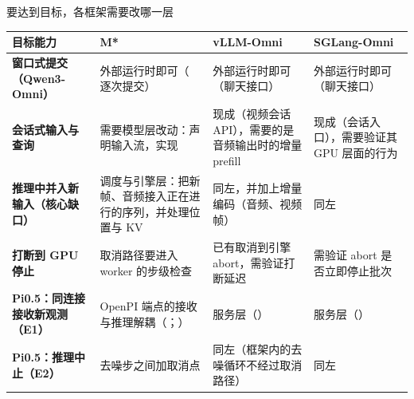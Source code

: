 \begin{frame}[t]{要达到目标，各框架需要改哪一层}
\scriptsize
\renewcommand{\arraystretch}{1.12}
\setlength{\tabcolsep}{3pt}
\begin{tabularx}{\textwidth}{>{\bfseries}p{2.6cm} Y Y Y}
\toprule
{}
目标能力 & M* & vLLM-Omni & SGLang-Omni \\
\midrule
窗口式提交（Qwen3-Omni） & 外部运行时即可（ 逐次提交） & 外部运行时即可（聊天接口） & 外部运行时即可（聊天接口） \\
会话式输入与查询 & 需要模型层改动：声明输入流，实现  & 现成（视频会话 API），需要的是音频输出时的增量 prefill & 现成（会话入口），需要验证其 GPU 层面的行为 \\
推理中并入新输入（核心缺口） & 调度与引擎层：把新帧、音频接入正在进行的序列，并处理位置与 KV & 同左，并加上增量编码（音频、视频帧） & 同左 \\
打断到 GPU 停止 & 取消路径要进入 worker 的步级检查 & 已有取消到引擎 abort，需验证打断延迟 & 需验证 abort 是否立即停止批次 \\
Pi0.5：同连接接收新观测（E1） & OpenPI 端点的接收与推理解耦（；） & 服务层（） & 服务层（） \\
Pi0.5：推理中止（E2） & 去噪步之间加取消点 & 同左（框架内的去噪循环不经过取消路径） & 同左 \\
\bottomrule
\end{tabularx}
\par{}
\par{}
\end{frame}
